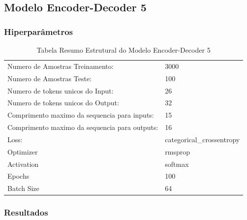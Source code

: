  
 \subsection{Modelo Encoder-Decoder 5}

\subsubsection{Hiperparâmetros} 

\begin{table}[H]
\centering
\begin{tabular}{ll}
Numero de Amostras Treinamento: & 3000 \\
Numero de Amostras Teste: & 100 \\
Numero de tokens unicos do Input: & 26 \\
Numero de tokens unicos do Output: & 32 \\
Comprimento maximo da sequencia para inputs: & 15 \\
Comprimento maximo da sequencia para outputs: & 16 \\
Loss: & categorical\_crossentropy \\
Optimizer & rmsprop \\
Activation & softmax \\
Epochs & 100 \\
Batch Size & 64
\end{tabular}
\caption{Tabela Resumo Estrutural do Modelo Encoder-Decoder 5}
\label{tab:res5}
\end{table}

\subsubsection{Resultados}


